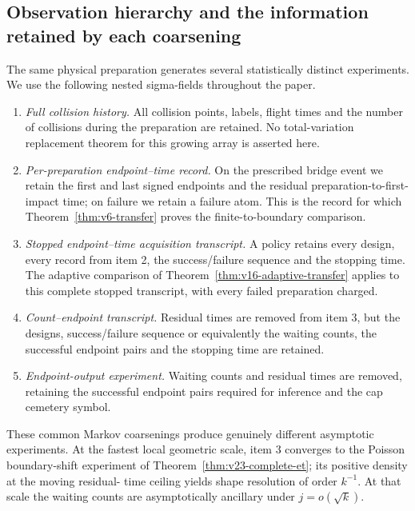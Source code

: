 \subsection{Observation hierarchy and the information retained by each coarsening}
\label{subsec:v23-observation-hierarchy}

The same physical preparation generates several statistically distinct
experiments.  We use the following nested sigma-fields throughout the paper.

\begin{enumerate}
\item \emph{Full collision history.}  All collision points, labels, flight
times and the number of collisions during the preparation are retained.  No
total-variation replacement theorem for this growing array is asserted here.

\item \emph{Per-preparation endpoint--time record.}  On the prescribed bridge
event we retain the first and last signed endpoints and the residual
preparation-to-first-impact time; on failure we retain a failure atom.  This is
the record for which Theorem~\ref{thm:v6-transfer} proves the finite-to-boundary
comparison.

\item \emph{Stopped endpoint--time acquisition transcript.}  A policy retains
every design, every record from item 2, the success/failure sequence and the
stopping time.  The adaptive comparison of
Theorem~\ref{thm:v16-adaptive-transfer} applies to this complete stopped
transcript, with every failed preparation charged.

\item \emph{Count--endpoint transcript.}  Residual times are removed from item
3, but the designs, success/failure sequence or equivalently the waiting
counts, the successful endpoint pairs and the stopping time are retained.

\item \emph{Endpoint-output experiment.}  Waiting counts and residual times are
removed, retaining the successful endpoint pairs required for inference and
the cap cemetery symbol.
\end{enumerate}

These common Markov coarsenings produce genuinely different asymptotic
experiments.  At the fastest local geometric scale, item 3 converges to the
Poisson boundary-shift experiment of
Theorem~\ref{thm:v23-complete-et}; its positive density at the moving residual-
time ceiling yields shape resolution of order \(k^{-1}\).  At that scale the
waiting counts are asymptotically ancillary under \(j=o(\sqrt k)\).

